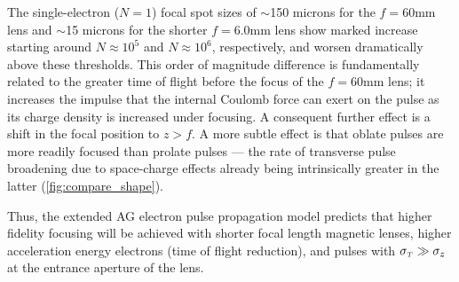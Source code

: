 The single-electron ($ N = 1 $) focal spot sizes of $\sim$150 microns for the $ f = 60 \text{mm} $ lens and $\sim$15 microns for the shorter $ f = 6.0 \text{mm} $ lens show marked increase starting around $ N \approx 10^{ 5 } $ and $ N \approx 10^{ 6 }$, respectively, and worsen dramatically above these thresholds.
This order of magnitude difference is fundamentally related to the greater time of flight before the focus of the $ f = 60\text{mm} $ lens; it increases the impulse that the internal Coulomb force can exert on the pulse as its charge density is increased under focusing.
A consequent further effect is a shift in the focal position to $ z > f $.
A more subtle effect is that oblate pulses are more readily focused than prolate pulses --- the rate of transverse pulse broadening due to space-charge effects already being intrinsically greater in the latter (\ref{fig:compare_shape}).


Thus, the extended AG electron pulse propagation model predicts that higher fidelity focusing will be achieved with shorter focal length magnetic lenses, higher acceleration energy electrons (time of flight reduction), and pulses with $ \sigma_{ {\scriptscriptstyle T} } \gg \sigma_{ z } $ at the entrance aperture of the lens.

